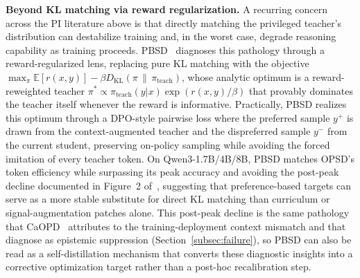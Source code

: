 \documentclass{article} %
\newcommand{\E}{\mathbb{E}}
\begin{document}
\textbf{Beyond KL matching via reward regularization.} A recurring concern across the PI literature above is that directly matching the privileged teacher's distribution can destabilize training and, in the worst case, degrade reasoning capability as training proceeds. PBSD~\citep{2605.05040} diagnoses this pathology through a reward-regularized lens, replacing pure KL matching with the objective $\max_{\pi} \E[r(x,y)] - \beta D_{\mathrm{KL}}(\pi \,\|\, \pi_{\text{teach}})$, whose analytic optimum is a reward-reweighted teacher $\pi^* \propto \pi_{\text{teach}}(y|x) \exp(r(x,y)/\beta)$ that provably dominates the teacher itself whenever the reward is informative. Practically, PBSD realizes this optimum through a DPO-style pairwise loss where the preferred sample $y^+$ is drawn from the context-augmented teacher and the dispreferred sample $y^-$ from the current student, preserving on-policy sampling while avoiding the forced imitation of every teacher token. On Qwen3-1.7B/4B/8B, PBSD matches OPSD's token efficiency while surpassing its peak accuracy and avoiding the post-peak decline documented in Figure~2 of~\citet{2605.05040}, suggesting that preference-based targets can serve as a more stable substitute for direct KL matching than curriculum or signal-augmentation patches alone. This post-peak decline is the same pathology that CaOPD~\citep{2604.16830} attributes to the training-deployment context mismatch and that~\citet{2603.24472} diagnose as epistemic suppression (Section~\ref{subsec:failure}), so PBSD can also be read as a self-distillation mechanism that converts these diagnostic insights into a corrective optimization target rather than a post-hoc recalibration step.
\end{document}

